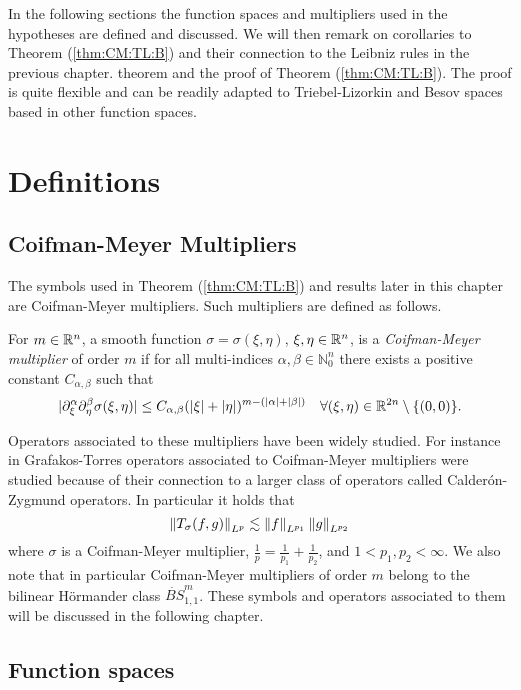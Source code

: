 In the following sections the function spaces and multipliers used in the hypotheses are defined and discussed. We will then remark on corollaries to Theorem (\ref{thm:CM:TL:B}) and their connection to the Leibniz rules in the previous chapter.  theorem and the proof of Theorem (\ref{thm:CM:TL:B}). The proof is quite flexible and can be readily adapted to Triebel-Lizorkin and Besov spaces based in other function spaces. 

\section{Definitions}

\subsection{Coifman-Meyer Multipliers}

The symbols used in Theorem (\ref{thm:CM:TL:B}) and results later in this chapter are Coifman-Meyer multipliers. Such multipliers are defined as follows.

\begin{dfn}\label{CM_def}
For $m\in{{\mathbb R}^n}$, a smooth function $\sigma = \sigma(\xi,\eta)$, $\xi,\eta\in{{\mathbb R}^n}$, is a \textit{Coifman-Meyer multiplier} of order $m$ if for all multi-indices $\alpha,\beta\in\mathbb{N}^n_0$ there exists a positive constant $C_{\alpha,\beta}$ such that 
\begin{equation}\label{eq:CMm}
|\partial_\xi^\alpha \partial_\eta^\beta \sigma(\xi, \eta)| \leq C_{\alpha, \beta} (|\xi|+|\eta|)^{m -(\left\vert \alpha \right\vert+ \left\vert \beta \right\vert)} \quad \forall (\xi, \eta) \in \mathbb{R}^{2n} \setminus \{(0,0)\}.
\end{equation}
\end{dfn}
Operators associated to these multipliers have been widely studied. For instance in Grafakos-Torres \cite{MR1880324} operators associated to Coifman-Meyer multipliers were studied because of their connection to a larger class of operators called Calder\'on-Zygmund operators. In particular it holds that 
\[ \left\|T_\sigma(f,g)\right\|_{L^p}\lesssim \left\|f\right\|_{L^{p_1}}\left\|g\right\|_{L^{p_2}} \]
where $\sigma$ is a Coifman-Meyer multiplier, $\frac{1}{p} = \frac{1}{p_1} + \frac{1}{p_2}$, and $1<p_1,p_2<\infty$. 
We also note that in particular Coifman-Meyer multipliers of order $m$ belong to the bilinear H\"ormander class $\dot{BS}^m_{1,1}$. These symbols and operators associated to them will be discussed in the following chapter. 

\subsection{Function spaces}

